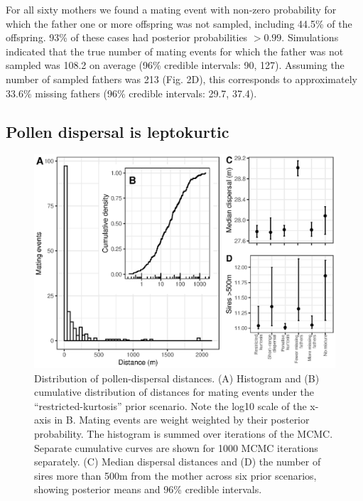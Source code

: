 \documentclass[10pt, a4paper, twocolumn]{article} %
\begin{document}
For all sixty mothers we found a mating event with non-zero probability for which the father one or more offspring was not sampled, including 44.5\% of the offspring. 93\% of these cases had posterior probabilities $>0.99$. Simulations indicated that the true number of mating events for which the father was not sampled was 108.2 on average (96\% credible intervals: 90, 127). Assuming the number of sampled fathers was 213 (Fig. 2D), this corresponds to approximately 33.6\% missing fathers (96\% credible intervals: 29.7, 37.4).

\subsection{Pollen dispersal is leptokurtic}

\begin{figure}
    \centering
    \includegraphics{dispersal.eps}
    \caption{Distribution of pollen-dispersal distances.  (A) Histogram and (B) cumulative distribution of distances for mating events under the “restricted-kurtosis” prior scenario. Note the log10 scale of the x-axis in B. Mating events are weight weighted by their posterior probability. The histogram is summed over iterations of the MCMC. Separate cumulative curves are shown for 1000 MCMC iterations separately. (C) Median dispersal distances and (D) the number of sires more than 500m from the mother across six prior scenarios, showing posterior means and 96\% credible intervals.}
    \label{fig:dispersal}
\end{figure}
\end{document}
